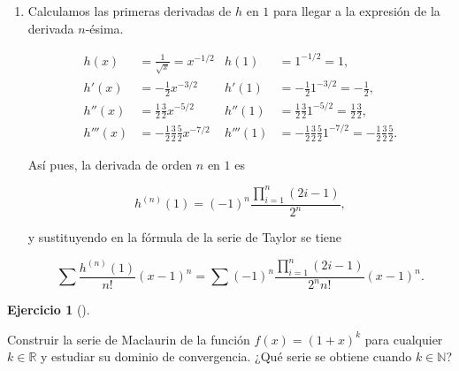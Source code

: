 \documentclass[
  spanish,
  a4paper,
]{scrreport}
\theoremstyle{definition}
\newtheorem{exercise}{Ejercicio}[chapter]
\theoremstyle{remark}
\begin{document}
\begin{tcolorbox}
\begin{enumerate}
  Así pues, la derivada de orden \(n\) en \(0\) es

  \[
   g^{(n)}(0) = (-1)^{n-1}(n-1)!
   \]

  y sustituyendo en la fórmula de la serie de Taylor se tiene

  \[
   \sum \frac{g^{(n)}(0)}{n!}x^n = \sum \frac{(-1)^{n-1}(n-1)!}{n!}x^n = \sum \frac{(-1)^{n-1}}{n}x^n.
   \]
\item
  Calculamos las primeras derivadas de \(h\) en \(1\) para llegar a la
  expresión de la derivada \(n\)-ésima.

  \begin{align*}
   h(x) &= \frac{1}{\sqrt{x}} = x^{-1/2} & h(1) &= 1^{-1/2} = 1,\\
   h'(x) &= -\frac{1}{2}x^{-3/2} & h'(1) &= -\frac{1}{2}1^{-3/2} = -\frac{1}{2},\\
   h''(x) &= \frac{1}{2}\frac{3}{2}x^{-5/2} & h''(1) &= \frac{1}{2}\frac{3}{2}1^{-5/2} = \frac{1}{2}\frac{3}{2},\\
   h'''(x) &= -\frac{1}{2}\frac{3}{2}\frac{5}{2}x^{-7/2} & h'''(1) &= -\frac{1}{2}\frac{3}{2}\frac{5}{2}1^{-7/2} = -\frac{1}{2}\frac{3}{2}\frac{5}{2}.
   \end{align*}

  Así pues, la derivada de orden \(n\) en \(1\) es

  \[
   h^{(n)}(1) = (-1)^n\frac{\prod_{i=1}^n(2i-1)}{2^n},
   \]

  y sustituyendo en la fórmula de la serie de Taylor se tiene

  \[
   \sum \frac{h^{(n)}(1)}{n!}(x-1)^n = \sum (-1)^n\frac{\prod_{i=1}^n(2i-1)}{2^nn!}(x-1)^n.
   \]
\end{enumerate}

\end{tcolorbox}

\begin{exercise}[]\protect\hypertarget{exr-serie-binomial}{}\label{exr-serie-binomial}

Construir la serie de Maclaurin de la función \(f(x)= (1+x)^k\) para
cualquier \(k\in\mathbb{R}\) y estudiar su dominio de convergencia. ¿Qué
serie se obtiene cuando \(k\in\mathbb{N}\)?

\end{exercise}
\end{document}

